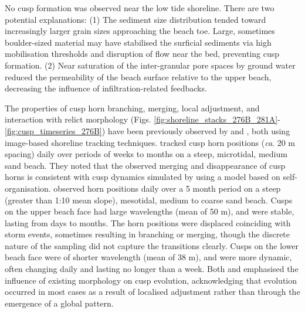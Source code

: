 No cusp formation was observed near the low tide shoreline. There are two potential explanations: (1) The sediment size distribution tended toward increasingly larger grain sizes approaching the beach toe. Large, sometimes boulder-sized material may have stabilised the surficial sediments via high mobilisation thresholds and disruption of flow near the bed, preventing cusp formation. (2) Near saturation of the inter-granular pore spaces by ground water reduced the permeability of the beach surface relative to the upper beach, decreasing the influence of infiltration-related feedbacks.

The properties of cusp horn branching, merging, local adjustment, and interaction with relict morphology (Figs. \ref{fig:shoreline_stacks_276B_281A}-\ref{fig:cusp_timeseries_276B}) have been previously observed by \citet{Almar_etal2008} and \citet{Vousdoukas2012}, both using image-based shoreline tracking techniques. \citet{Almar_etal2008} tracked cusp horn positions (\textit{ca}. 20 m spacing) daily over periods of weeks to months on a steep, microtidal, medium sand beach. They noted that the observed merging and disappearance of cusp horns is consistent with cusp dynamics simulated by \citet{Coco_etal2000} using a model based on self-organisation. \citet{Vousdoukas2012} observed horn positions daily over a 5 month period on a steep (greater than 1:10 mean slope), mesotidal, medium to coarse sand beach. Cusps on the upper beach face had large wavelengths (mean of 50 m), and were stable, lasting from days to months. The horn positions were displaced coinciding with storm events, sometimes resulting in branching or merging, though the discrete nature of the sampling did not capture the transitions clearly. Cusps on the lower beach face were of shorter wavelength (mean of 38 m), and were more dynamic, often changing daily and lasting no longer than a week. Both \citet{Almar_etal2008} and \citet{Vousdoukas2012} emphasised the influence of existing morphology on cusp evolution, acknowledging that evolution occurred in most cases as a result of localised adjustment rather than through the emergence of a global pattern. 

